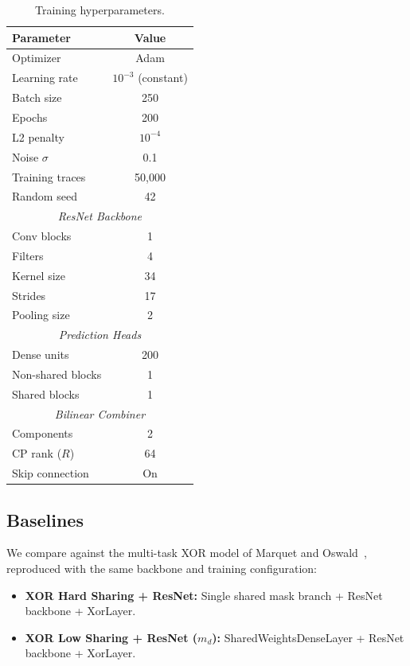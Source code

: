 \documentclass[submission]{iacrtrans}
\begin{document}
\begin{table}[t]
  \centering
  \caption{Training hyperparameters.}
  \label{tab:hyperparams}
  \begin{tabular}{lc}
    \toprule
    \textbf{Parameter} & \textbf{Value} \\
    \midrule
    Optimizer       & Adam \\
    Learning rate   & $10^{-3}$ (constant) \\
    Batch size      & 250 \\
    Epochs          & 200 \\
    L2 penalty      & $10^{-4}$ \\
    Noise $\sigma$  & 0.1 \\
    Training traces & 50{,}000 \\
    Random seed     & 42 \\
    \midrule
    \multicolumn{2}{c}{\textit{ResNet Backbone}} \\
    \midrule
    Conv blocks     & 1 \\
    Filters         & 4 \\
    Kernel size     & 34 \\
    Strides         & 17 \\
    Pooling size    & 2 \\
    \midrule
    \multicolumn{2}{c}{\textit{Prediction Heads}} \\
    \midrule
    Dense units     & 200 \\
    Non-shared blocks & 1 \\
    Shared blocks   & 1 \\
    \midrule
    \multicolumn{2}{c}{\textit{Bilinear Combiner}} \\
    \midrule
    Components      & 2 \\
    CP rank ($R$)   & 64 \\
    Skip connection & On \\
    \bottomrule
  \end{tabular}
\end{table}

\subsection{Baselines}

We compare against the multi-task XOR model of Marquet and Oswald~\cite{marquet2024exploring}, reproduced with the same backbone and training configuration:
\begin{itemize}[leftmargin=*]
  \item \textbf{XOR Hard Sharing + ResNet:} Single shared mask branch + ResNet backbone + XorLayer.
  \item \textbf{XOR Low Sharing + ResNet ($m_d$):} SharedWeightsDenseLayer + ResNet backbone + XorLayer.
\end{itemize}
\end{document}
